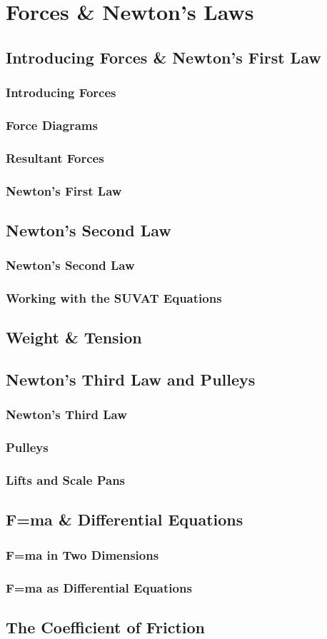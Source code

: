 \documentclass[../maths.tex]{subfiles}
\begin{document}
\chapter{Forces \& Newton's Laws}
\section{Introducing Forces \& Newton's First Law}
\subsection*{Introducing Forces}
\subsection*{Force Diagrams}
\subsection*{Resultant Forces}
\subsection*{Newton's First Law}
\section{Newton's Second Law}
\subsection*{Newton's Second Law}
\subsection*{Working with the SUVAT Equations}
\section{Weight \& Tension}
\section{Newton's Third Law and Pulleys}
\subsection*{Newton's Third Law}
\subsection*{Pulleys}
\subsection*{Lifts and Scale Pans}
\section{F=ma \& Differential Equations}
\subsection*{F=ma in Two Dimensions}
\subsection*{F=ma as Differential Equations}
\section{The Coefficient of Friction}
\end{document}
